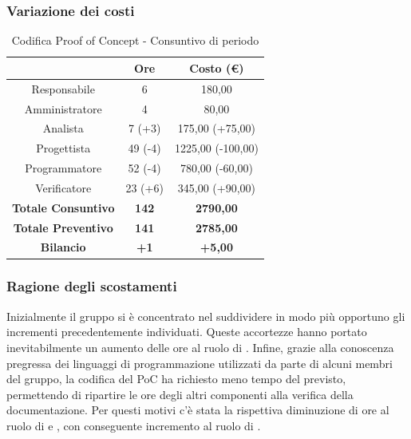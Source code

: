 \subsubsection{Variazione dei costi} \label{subsubsection:variazione_costi_Poc}

\begin{table}[H]
  \centering
  \renewcommand{\arraystretch}{1.8}
  \begin{tabular}{c|c|c}
    \rowcolor[HTML]{125E28}
    \multicolumn{1}{c}{\color[HTML]{FFFFFF}\textbf{Ruolo}} &
    \multicolumn{1}{c}{\color[HTML]{FFFFFF}\textbf{Ore}}   &
    \multicolumn{1}{c}{\color[HTML]{FFFFFF}\textbf{Costo (€)}}                                \\
    \hline
    Responsabile                                           & 6            & 180,00            \\
    Amministratore                                         & 4            & 80,00             \\
    Analista                                               & 7 (+3)       & 175,00 (+75,00)   \\
    Progettista                                            & 49 (-4)      & 1225,00 (-100,00) \\
    Programmatore                                          & 52 (-4)      & 780,00 (-60,00)   \\
    Verificatore                                           & 23 (+6)      & 345,00 (+90,00)   \\
    \textbf{Totale Consuntivo}                             & \textbf{142} & \textbf{2790,00}  \\
    \textbf{Totale Preventivo}                             & \textbf{141} & \textbf{2785,00}  \\
    \textbf{Bilancio}                                      & \textbf{+1}  & \textbf{+5,00}    \\
  \end{tabular}
  \caption{Codifica Proof of Concept - Consuntivo di periodo}
\end{table}

\pagebreak
\subsubsection{Ragione degli scostamenti} \label{subsubsection:ragione_scostamenti_PoC}
Inizialmente il gruppo si è concentrato nel suddividere in modo più opportuno gli incrementi precedentemente individuati.
Queste accortezze hanno portato inevitabilmente un aumento delle ore al ruolo di \roleAnalystLow{}.
Infine, grazie alla conoscenza pregressa dei linguaggi di programmazione utilizzati da parte di alcuni membri del gruppo, la codifica del PoC ha richiesto meno tempo del previsto, permettendo di ripartire le ore degli altri componenti alla verifica della documentazione.
Per questi motivi c'è stata la rispettiva diminuzione di ore al ruolo di \roleDesignerLow{} e \roleProgrammerLow{}, con conseguente incremento al ruolo di \roleVerifierLow{}.

